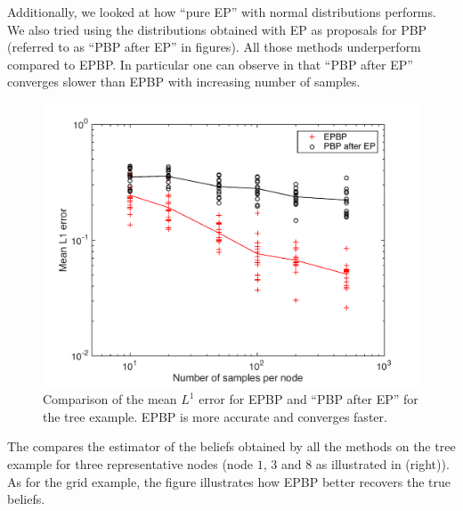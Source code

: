 Additionally, we looked at how ``pure EP'' with normal distributions performs. We also tried using the distributions obtained with EP as proposals for PBP (referred to as ``PBP after EP'' in figures). All those methods underperform compared to EPBP. In particular one can observe in  that ``PBP after EP'' converges slower than EPBP with increasing number of samples.
%
%
%
\begin{figure}[!h]
\center
\includegraphics[width=.6\textwidth]{figures/epbp/errComparisonEP}
\caption{\label{compPBPaEP}Comparison of the mean $L^{1}$ error for EPBP and ``PBP after EP'' for the tree example. EPBP is more accurate and converges faster.}
\end{figure}


The  compares the estimator of the beliefs obtained by all the methods on the tree example for three representative nodes (node $1$, $3$ and $8$ as illustrated in  (right)). As for the grid example, the figure illustrates how EPBP better recovers the true beliefs. 



